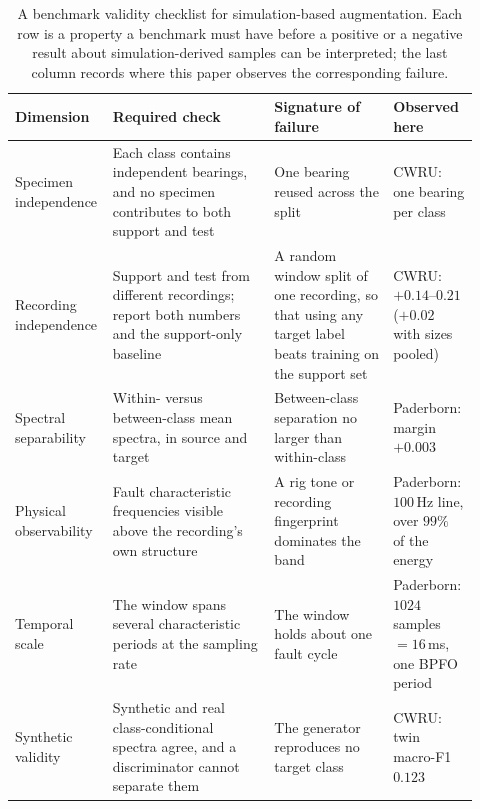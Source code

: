 \documentclass[journal]{IEEEtran}
\begin{document}
\begin{table}[t]
\centering
\caption{A benchmark validity checklist for simulation-based augmentation. Each
row is a property a benchmark must have before a positive or a negative result
about simulation-derived samples can be interpreted; the last column records
where this paper observes the corresponding failure.}
\label{tab:checklist}
\footnotesize
\begin{tabular}{@{}>{\raggedright\arraybackslash}p{0.15\linewidth}>{\raggedright\arraybackslash}p{0.34\linewidth}>{\raggedright\arraybackslash}p{0.25\linewidth}>{\raggedright\arraybackslash}p{0.18\linewidth}@{}}
\toprule
Dimension & Required check & Signature of failure & Observed here \\
\midrule
Specimen independence & Each class contains independent bearings, and no
specimen contributes to both support and test & One bearing reused across the
split & CWRU: one bearing per class \\
Recording independence & Support and test from different recordings; report both
numbers and the support-only baseline & A random window split of one recording,
so that using any target label beats training on the support set & CWRU:
$+0.14$--$0.21$ ($+0.02$ with sizes pooled) \\
Spectral separability & Within- versus between-class mean spectra, in source and
target & Between-class separation no larger than within-class & Paderborn:
margin $+0.003$ \\
Physical observability & Fault characteristic frequencies visible above the
recording's own structure & A rig tone or recording fingerprint dominates the
band & Paderborn: $100$\,Hz line, over $99\%$ of the energy \\
Temporal scale & The window spans several characteristic periods at the
sampling rate & The window holds about one fault cycle & Paderborn: $1024$
samples $=16$\,ms, one BPFO period \\
Synthetic validity & Synthetic and real class-conditional spectra agree, and a
discriminator cannot separate them & The generator reproduces no target class &
CWRU: twin macro-F1 $0.123$ \\
\bottomrule
\end{tabular}
\end{table}
\end{document}
